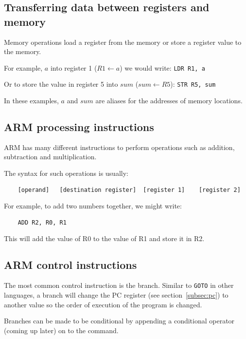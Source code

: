 \documentclass{article}
\begin{document}
\subsection{Transferring data between registers and memory}

Memory operations load a register from the memory or store a register value to the memory.

For example, $a$ into register 1 ($R1 \leftarrow a$) we would write:
{\tt LDR R1, a}

Or to store the value in register 5 into $sum$ ($sum \leftarrow R5$):
{\tt STR R5, sum}

In these examples, $a$ and $sum$ are aliases for the addresses of memory locations.

\subsection{ARM processing instructions}

ARM has many different instructions to perform operations such as addition, subtraction and multiplication.

The syntax for such operations is usually:

\begin{verbatim}
	[operand]	[destination register]	[register 1]	[register 2]
\end{verbatim}

For example, to add two numbers together, we might write:

\begin{verbatim}
	ADD R2, R0, R1
\end{verbatim}

This will add the value of R0 to the value of R1 and store it in R2.

\subsection{ARM control instructions}

The most common control instruction is the branch. Similar to \texttt{GOTO} in other languages, a branch will change the PC register (see section~\ref{subsec:pc}) to another value so the order of execution of the program is changed.


Branches can be made to be conditional by appending a conditional operator (coming up later) on to the command.
\end{document}

